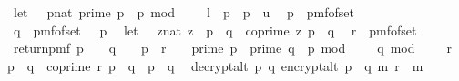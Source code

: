 \begin{isabellebody}
\ \ let\ {\isasymK}\ {\isacharequal}{\kern0pt}\ {\isacharbraceleft}{\kern0pt}{\isacharparenleft}{\kern0pt}p{\isacharcolon}{\kern0pt}{\isacharcolon}{\kern0pt}nat{\isacharparenright}{\kern0pt}{\isachardot}{\kern0pt}\ prime\ p\ {\isasymand}\ p\ mod\ {}\ {\isacharequal}{\kern0pt}\ {}\ {\isasymand}\ l\ {\isasymle}\ p\ {\isasymand}\ p\ {\isasymle}\ u{\isacharbraceright}{\kern0pt}{\isacharsemicolon}{\kern0pt}\isanewline
\ \ p\ {\isasymleftarrow}\ pmf{\isacharunderscore}{\kern0pt}of{\isacharunderscore}{\kern0pt}set\ {\isasymK}{\isacharsemicolon}{\kern0pt}\ \isanewline
\ \ q\ {\isasymleftarrow}\ pmf{\isacharunderscore}{\kern0pt}of{\isacharunderscore}{\kern0pt}set\ {\isacharparenleft}{\kern0pt}{\isasymK}\ {\isacharminus}{\kern0pt}\ {\isacharbraceleft}{\kern0pt}p{\isacharbraceright}{\kern0pt}{\isacharparenright}{\kern0pt}{\isacharsemicolon}{\kern0pt}\isanewline
\ \ let\ {\isasymZ}\ {\isacharequal}{\kern0pt}\ {\isacharbraceleft}{\kern0pt}{\isacharparenleft}{\kern0pt}z{\isacharcolon}{\kern0pt}{\isacharcolon}{\kern0pt}nat{\isacharparenright}{\kern0pt}{\isachardot}{\kern0pt}\ z\ {\isacharless}{\kern0pt}\ p\ {\isacharasterisk}{\kern0pt}\ q\ {\isasymand}\ coprime\ z\ {\isacharparenleft}{\kern0pt}p\ {\isacharasterisk}{\kern0pt}\ q{\isacharparenright}{\kern0pt}{\isacharbraceright}{\kern0pt}{\isacharsemicolon}{\kern0pt}\isanewline
\ \ r\ {\isasymleftarrow}\ pmf{\isacharunderscore}{\kern0pt}of{\isacharunderscore}{\kern0pt}set\ {\isasymZ}{\isacharsemicolon}{\kern0pt}\isanewline
\ \ return{\isacharunderscore}{\kern0pt}pmf\ {\isacharparenleft}{\kern0pt}{\isacharparenleft}{\kern0pt}{\isacharparenleft}{\kern0pt}p\ {\isasymin}\ {\isasymK}\ {\isasymand}\ q\ {\isasymin}\ {\isasymK}\ {\isacharminus}{\kern0pt}\ {\isacharbraceleft}{\kern0pt}p{\isacharbraceright}{\kern0pt}\ {\isasymand}\ r\ {\isasymin}\ {\isasymZ}{\isacharparenright}{\kern0pt}\ {\isasymor}\ {\isacharparenleft}{\kern0pt}prime\ p\ {\isasymand}\ prime\ q\ {\isasymand}\ p\ mod\ {}\ {\isacharequal}{\kern0pt}\ {}\ {\isasymand}\ q\ mod\ {}\ {\isacharequal}{\kern0pt}\ {}\ {\isasymand}\ r\ {\isacharless}{\kern0pt}\ p\ {\isacharasterisk}{\kern0pt}\ q\ {\isasymand}\ coprime\ r\ {\isacharparenleft}{\kern0pt}p\ {\isacharasterisk}{\kern0pt}\ q{\isacharparenright}{\kern0pt}\ {\isasymand}\ p\ {\isasymnoteq}\ q{\isacharparenright}{\kern0pt}{\isacharparenright}{\kern0pt}\isanewline
\ {\isasymor}\ decrypt{\isacharunderscore}{\kern0pt}alt\ p\ q\ {\isacharparenleft}{\kern0pt}encrypt{\isacharunderscore}{\kern0pt}alt\ {\isacharparenleft}{\kern0pt}p\ {\isacharasterisk}{\kern0pt}\ q{\isacharparenright}{\kern0pt}\ m\ r{\isacharparenright}{\kern0pt}\ {\isacharequal}{\kern0pt}\ m{\isacharparenright}{\kern0pt}{\isacharbraceright}{\kern0pt}{\isacharparenright}{\kern0pt}\isanewline

\end{isabellebody}
